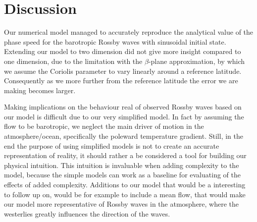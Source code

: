 \section{Discussion}

Our numerical model managed to accurately reproduce the analytical value of the
phase speed for the barotropic Rossby waves with sinusoidal initial state.
Extending our model to two dimension did not give more insight compared to
 one dimension, due to the limitation with the $\beta$-plane approximation, by
which we assume the Coriolis parameter to vary linearly around a reference
latitude. Consequently as we more further from the reference latitude the error
we are making becomes larger. 

Making implications on the behaviour real of
observed Rossby waves based on our model is difficult due to our very simplified
model. In fact  by assuming the flow to be barotropic, we neglect the main
driver of motion in the atmosphere/ocean, specifically the poleward
temperature gradient. Still, in the end the purpose of using simplified models
is not to create an accurate representation of reality, it should rather a be
considered a tool for building our physical intuition. This intuition is
invaluable when adding complexity to the model, because the simple models can
work as a baseline for evaluating of the effects of added complexity.
Additions to our model that would be a interesting to follow up on, would be for
example to include a mean flow, that would make our model more representative of
Rossby waves in the atmosphere, where the westerlies greatly influences the
direction of the waves.  